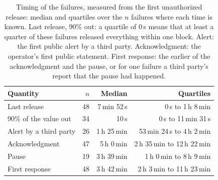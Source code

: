 \begin{table}[t]
\centering
\caption{Timing of the failures, measured from the first unauthorized release: median and quartiles over the $n$ failures where each time is known. Last release, 90\% out: a quartile of 0\,s means that at least a quarter of these failures released everything within one block. Alert: the first public alert by a third party. Acknowledgment: the operator's first public statement. First response: the earlier of the acknowledgment and the pause, or for one failure a third party's report that the pause had happened.}
\label{tab:timing}
\footnotesize
\setlength{\tabcolsep}{4pt}
\begin{tabular}{@{}l r r r@{}}
\toprule
Quantity & $n$ & Median & Quartiles \\
\midrule
Last release & 48 & 7\,min 52\,s & 0\,s to 1\,h 8\,min \\
90\% of the value out & 34 & 10\,s & 0\,s to 11\,min 31\,s \\
Alert by a third party & 26 & 1\,h 25\,min & 53\,min 24\,s to 4\,h 2\,min \\
Acknowledgment & 47 & 5\,h 0\,min & 2\,h 35\,min to 12\,h 22\,min \\
Pause & 19 & 3\,h 39\,min & 1\,h 0\,min to 8\,h 9\,min \\
First response & 48 & 3\,h 42\,min & 2\,h 3\,min to 11\,h 23\,min \\
\bottomrule
\end{tabular}
\end{table}
